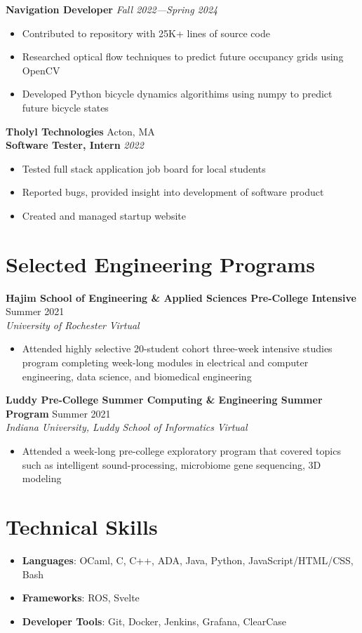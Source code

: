 \documentclass[letterpaper,10pt]{article}
\newcommand{\company}[2]{
    \vspace{6pt}
    {\large \textbf{#1}}
    \hfill
    {\normalsize {#2}}
    \\
}
\newcommand{\position}[2]{
    \vspace{4pt}
    {\normalsize \textbf {#1}}
    \hfill
    {\normalsize \textit{#2}}
    \\
}
\newcommand{\resumeEntry}[4]{
    \vspace{4pt}
    {\large \textbf{#1}}
    \hfill
    {\normalsize #2}
    \\
    \textit{#3} \hfill \textit{#4}
    \vspace{1pt}
}
\newcommand{\itemsBegin}{
    \begin{itemize}[leftmargin=0.2in, labelsep=0.05in, itemsep=0pt, parsep=1pt, topsep=0pt, partopsep=0pt]
}
\newcommand{\itemsEnd}{\end{itemize}}
\begin{document}
    \position{Navigation Developer}{Fall 2022---Spring 2024}
    \itemsBegin{}
        \item Contributed to repository with 25K+ lines of source code
        \item Researched optical flow techniques to predict future occupancy grids using OpenCV
        \item Developed Python bicycle dynamics algorithims using numpy to predict future bicycle states
    \itemsEnd{}

    \company{Tholyl Technologies}{Acton, MA}

    \position{Software Tester, Intern}{2022}
    \itemsBegin
        \item Tested full stack application job board for local students
        \item Reported bugs, provided insight into development of software product
        \item Created and managed startup website
    \itemsEnd


\section{Selected Engineering Programs}


    \resumeEntry{Hajim School of Engineering \& Applied Sciences Pre-College Intensive}
        {Summer 2021}
        {University of Rochester}
        {Virtual}

    \itemsBegin{}
        \item Attended highly selective 20-student cohort three-week intensive studies program completing week-long modules in electrical and computer engineering, data science, and biomedical engineering
    \itemsEnd{}

    \resumeEntry{Luddy Pre-College Summer Computing \& Engineering Summer Program}
        {Summer 2021}
        {Indiana University, Luddy School of Informatics}
        {Virtual}

    \itemsBegin{}
        \item Attended a week-long pre-college exploratory program that covered topics such as intelligent sound-processing, microbiome gene sequencing, 3D modeling
    \itemsEnd{}

\section{Technical Skills}

    \itemsBegin{}
        \item \textbf{Languages}{: OCaml, C, C++, ADA, Java, Python, JavaScript/HTML/CSS, Bash}
        \item \textbf{Frameworks}{: ROS, Svelte}
        \item \textbf{Developer Tools}{: Git, Docker, Jenkins, Grafana, ClearCase}
    \itemsEnd{}
\end{document}
